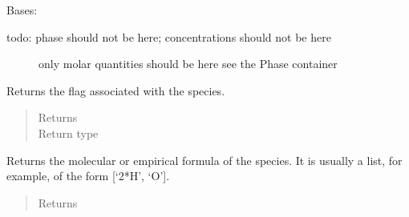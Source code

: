 \documentclass[letterpaper,10pt,openany,oneside,english]{sphinxmanual}
\begin{document}
\begin{fulllineitems}
\label{\detokenize{support_rst/specie:specie.Specie}}
Bases: 
\begin{description}
\item[{todo: phase should not be here; concentrations should not be here}] \leavevmode
only molar quantities should be here
see the Phase container

\end{description}

\begin{fulllineitems}
\label{\detokenize{support_rst/specie:specie.Specie.GetAtoms}}
\end{fulllineitems}


\begin{fulllineitems}
\label{\detokenize{support_rst/specie:specie.Specie.GetFlag}}
Returns the flag associated with the species.
\begin{quote}\begin{description}
\item[{Returns}] \leavevmode
{}

\item[{Return type}] \leavevmode
{}

\end{description}\end{quote}

\end{fulllineitems}


\begin{fulllineitems}
\label{\detokenize{support_rst/specie:specie.Specie.GetFormula}}
Returns the molecular or empirical formula of the species. It is
usually a list, for example, of the form {[}‘2*H’, ‘O’{]}.
\begin{quote}\begin{description}
\item[{Returns}] \leavevmode
{}


\end{description}
\end{quote}
\end{fulllineitems}
\end{fulllineitems}
\end{document}
